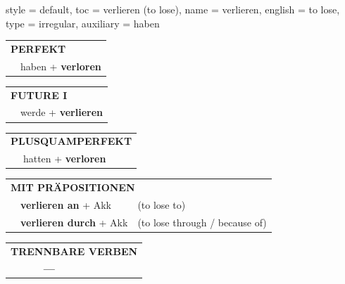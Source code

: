 \begin{verbentry}{
  style = {default},
  toc = {verlieren (to lose)},
  name = {verlieren},
  english = {to lose},
  type = {irregular},
  auxiliary = {haben}
}
 \begin{tabular}{rl}
     \multicolumn{2}{l}{\textbf{PERFEKT}}\\
   & haben + \textbf{verloren}\\
  \end{tabular}
\hfill
   \begin{tabular}{rl}
    \multicolumn{2}{l}{\textbf{FUTURE I} }\\
   & werde + \textbf{verlieren}\\
  \end{tabular}
\hfill
   \begin{tabular}{rl}
      \multicolumn{2}{l}{\textbf{PLUSQUAMPERFEKT}}\\
   & hatten + \textbf{verloren}\\
  \end{tabular}

   \vspace{10pt}

   \begin{tabular}{lll}
      \multicolumn{3}{l}{\textbf{MIT PRÄPOSITIONEN}}\\
& \textbf{verlieren an} + Akk & (to lose to)\\
& \textbf{verlieren durch} + Akk & (to lose through / because of)\\
\end{tabular}
  \hfill
   \begin{tabular}{lll}
\multicolumn{3}{l}{\textbf{TRENNBARE VERBEN}}\\
& \textbf{---} & \\
\end{tabular}

  \vspace{-5pt}
\end{verbentry}

